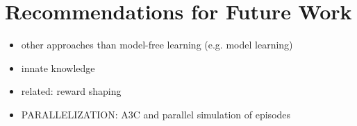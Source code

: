 \chapter{Recommendations for Future Work}
\label{ch:future_work}
\begin{itemize}
    \item other approaches than model-free learning (e.g. model learning)
    \item innate knowledge
    \item related: reward shaping
    \item PARALLELIZATION: A3C and parallel simulation of episodes
\end{itemize}